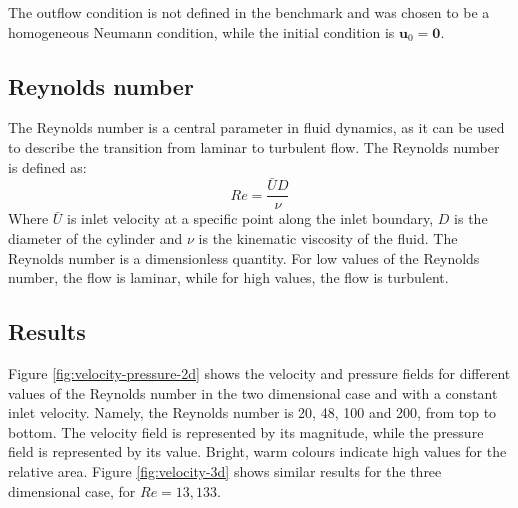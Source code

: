 The outflow condition is not defined in the benchmark and was chosen to be a homogeneous Neumann condition, while the initial condition is $\mathbf{u}_0 = \mathbf{0}$.

\subsection{Reynolds number}
The Reynolds number is a central parameter in fluid dynamics, as it can be used to describe the transition from laminar to turbulent flow. The Reynolds number is defined as:
\begin{equation}
    Re = \frac{\bar{U} D}{\nu}
\end{equation}
Where $\bar{U}$ is inlet velocity at a specific point along the inlet boundary, $D$ is the diameter of the cylinder and $\nu$ is the kinematic viscosity of the fluid. The Reynolds number is a dimensionless quantity. For low values of the Reynolds number, the flow is laminar, while for high values, the flow is turbulent.

\subsection{Results}
Figure \ref{fig:velocity-pressure-2d} shows the velocity and pressure fields for different values of the Reynolds number in the two dimensional case and with a constant inlet velocity. Namely, the Reynolds number is 20, 48, 100 and 200, from top to bottom. The velocity field is represented by its magnitude, while the pressure field is represented by its value. Bright, warm colours indicate high values for the relative area. Figure \ref{fig:velocity-3d} shows similar results for the three dimensional case, for $Re = 13, 133$.

